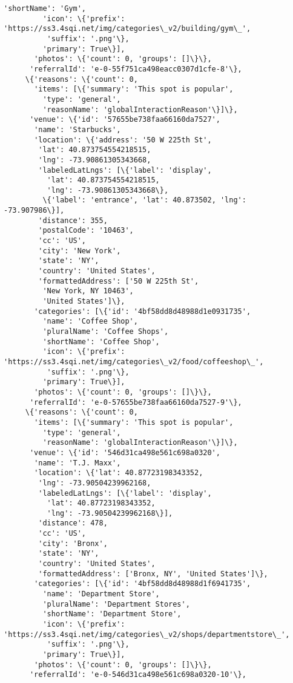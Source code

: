 \documentclass[11pt]{article}
\begin{document}
\begin{tcolorbox}[breakable, size=fbox, boxrule=.5pt, pad at break*=1mm, opacityfill=0]
\begin{Verbatim}[commandchars=\\\{\}]
         'shortName': 'Gym',
         'icon': \{'prefix':
'https://ss3.4sqi.net/img/categories\_v2/building/gym\_',
          'suffix': '.png'\},
         'primary': True\}],
       'photos': \{'count': 0, 'groups': []\}\},
      'referralId': 'e-0-55f751ca498eacc0307d1cfe-8'\},
     \{'reasons': \{'count': 0,
       'items': [\{'summary': 'This spot is popular',
         'type': 'general',
         'reasonName': 'globalInteractionReason'\}]\},
      'venue': \{'id': '57655be738faa66160da7527',
       'name': 'Starbucks',
       'location': \{'address': '50 W 225th St',
        'lat': 40.873754554218515,
        'lng': -73.90861305343668,
        'labeledLatLngs': [\{'label': 'display',
          'lat': 40.873754554218515,
          'lng': -73.90861305343668\},
         \{'label': 'entrance', 'lat': 40.873502, 'lng': -73.907986\}],
        'distance': 355,
        'postalCode': '10463',
        'cc': 'US',
        'city': 'New York',
        'state': 'NY',
        'country': 'United States',
        'formattedAddress': ['50 W 225th St',
         'New York, NY 10463',
         'United States']\},
       'categories': [\{'id': '4bf58dd8d48988d1e0931735',
         'name': 'Coffee Shop',
         'pluralName': 'Coffee Shops',
         'shortName': 'Coffee Shop',
         'icon': \{'prefix':
'https://ss3.4sqi.net/img/categories\_v2/food/coffeeshop\_',
          'suffix': '.png'\},
         'primary': True\}],
       'photos': \{'count': 0, 'groups': []\}\},
      'referralId': 'e-0-57655be738faa66160da7527-9'\},
     \{'reasons': \{'count': 0,
       'items': [\{'summary': 'This spot is popular',
         'type': 'general',
         'reasonName': 'globalInteractionReason'\}]\},
      'venue': \{'id': '546d31ca498e561c698a0320',
       'name': 'T.J. Maxx',
       'location': \{'lat': 40.87723198343352,
        'lng': -73.90504239962168,
        'labeledLatLngs': [\{'label': 'display',
          'lat': 40.87723198343352,
          'lng': -73.90504239962168\}],
        'distance': 478,
        'cc': 'US',
        'city': 'Bronx',
        'state': 'NY',
        'country': 'United States',
        'formattedAddress': ['Bronx, NY', 'United States']\},
       'categories': [\{'id': '4bf58dd8d48988d1f6941735',
         'name': 'Department Store',
         'pluralName': 'Department Stores',
         'shortName': 'Department Store',
         'icon': \{'prefix':
'https://ss3.4sqi.net/img/categories\_v2/shops/departmentstore\_',
          'suffix': '.png'\},
         'primary': True\}],
       'photos': \{'count': 0, 'groups': []\}\},
      'referralId': 'e-0-546d31ca498e561c698a0320-10'\},

\end{Verbatim}
\end{tcolorbox}
\end{document}
